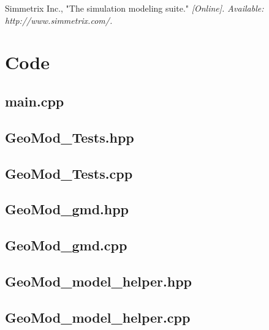 \documentclass[a4paper, 12pt]{article}
\begin{document}
\newpage
\begin{thebibliography}{99}

Simmetrix Inc., 
"The simulation modeling suite."
\textit{[Online]. Available: http://www.simmetrix.com/.}

\end{thebibliography}

\newpage
\appendix
\section{Code} \label{sec:code}

\subsection{main.cpp} \label{subsec:main_cpp}


\subsection{GeoMod\_Tests.hpp} \label{subsec:Tests_hpp}

\subsection{GeoMod\_Tests.cpp} \label{subsec:Tests_cpp}


\subsection{GeoMod\_gmd.hpp} \label{subsec:gmd_hpp}

\subsection{GeoMod\_gmd.cpp} \label{subsec:gmd_cpp}


\subsection{GeoMod\_model\_helper.hpp} \label{subsec:model_hpp}

\subsection{GeoMod\_model\_helper.cpp} \label{subsec:model_cpp}

\end{document}
